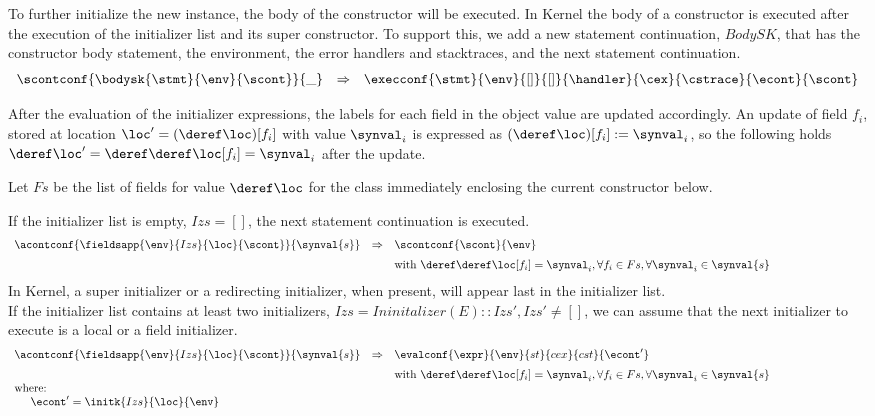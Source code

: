 \documentclass{article}
\begin{document}
\noindent
To further initialize the new instance, the body of the constructor will be executed. In Kernel the body of a constructor is executed after the execution of the initializer list and its super constructor.
\noindent
To support this, we add a new statement continuation, $BodySK$, that has the constructor body statement, the environment, the error handlers and stacktraces, and the next statement continuation.
\[
  \begin{array}{lcl}
	\scontconf{\bodysk{\stmt}{\env}{\scont}}{\_}
	& \Rightarrow &
	\execconf{\stmt}{\env}{[]}{[]}{\handler}{\cex}{\cstrace}{\econt}{\scont}
  \end{array}
\]

\noindent
After the evaluation of the initializer expressions, the labels for each field in the object value are updated accordingly. An update of field $f_i$, stored at location $\loc' = (\deref\loc)[f_i]$ with value $\synval_i$ is expressed as $\update{(\deref\loc)[f_i]}{\synval_{i}}$, so the following holds $\deref\loc' = \deref\deref\loc[f_i] = \synval_{i}$ after the update.

\noindent
Let $Fs$ be the list of fields for value $\deref\loc$ for the class immediately enclosing the current constructor below.

If the initializer list is empty, $Izs = []$, the next statement continuation is executed.
\[
  \begin{array}{lcl@{\hspace{30mm}}}
	\acontconf{\fieldsapp{\env}{Izs}{\loc}{\scont}}{\synval{s}}
	& \Rightarrow &
	\scontconf{\scont}{\env}\\[2mm]
	&&\textrm{with }\deref\deref\loc[f_i] = \synval_{i}, \forall f_i \in Fs, \forall \synval_i \in \synval{s}
  \end{array}
\]
\noindent
In Kernel, a super initializer or a redirecting initializer, when present, will appear last in the initializer list.\\
If the initializer list contains at least two initializers, $Izs = Ininitalizer(E) :: Izs', Izs' \neq []$, we can assume that the next initializer to execute is a local or a field initializer.
\[
  \begin{array}{lcl@{\hspace{30mm}}}
	\acontconf{\fieldsapp{\env}{Izs}{\loc}{\scont}}{\synval{s}}
	& \Rightarrow &
	\evalconf{\expr}{\env}{st}{cex}{cst}{\econt'}\\[2mm]
	&&\textrm{with }\deref\deref\loc[f_i] = \synval_{i}, \forall f_i \in Fs, \forall \synval_i \in \synval{s}\\
	\textrm{where:}\\
	\hspace{5mm}\econt' = \initk{Izs}{\loc}{\env}
  \end{array}
\]
\end{document}
